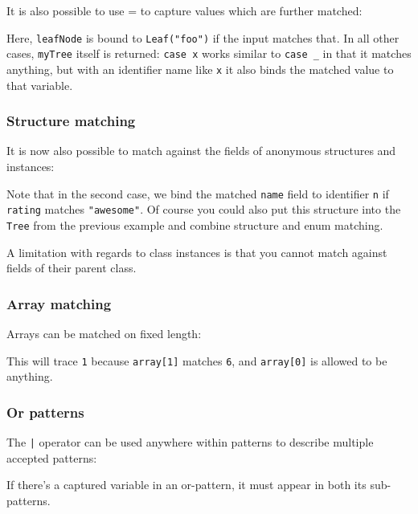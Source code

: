 \documentclass{article}
\newcommand{\type}[1]{\texttt{#1}}
\newcommand{\expr}[1]{\texttt{#1}}
\begin{document}
It is also possible to use = to capture values which are further matched:



Here, \expr{leafNode} is bound to \expr{Leaf("foo")} if the input matches that. In all other cases, \expr{myTree} itself is returned: \expr{case x} works similar to \expr{case _} in that it matches anything, but with an identifier name like \expr{x} it also binds the matched value to that variable.

\subsubsection{Structure matching}

It is now also possible to match against the fields of anonymous structures and instances:



Note that in the second case, we bind the matched \expr{name} field to identifier \expr{n} if \expr{rating} matches \expr{"awesome"}. Of course you could also put this structure into the \type{Tree} from the previous example and combine structure and enum matching.

A limitation with regards to class instances is that you cannot match against fields of their parent class.

\subsubsection{Array matching}

Arrays can be matched on fixed length:



This will trace \expr{1} because \expr{array[1]} matches \expr{6}, and \expr{array[0]} is allowed to be anything.

\subsubsection{Or patterns}

The \expr{|} operator can be used anywhere within patterns to describe multiple accepted patterns:



If there's a captured variable in an or-pattern, it must appear in both its sub-patterns.
\end{document}
